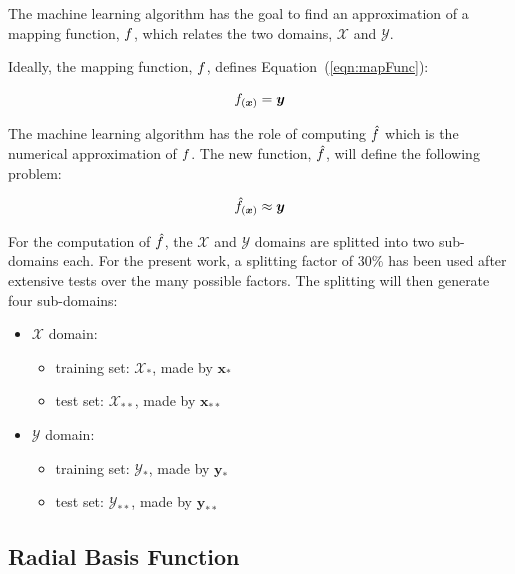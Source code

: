 The machine learning algorithm has the goal to find an approximation of a mapping function, $\mathnormal{f}$, which relates the 
two domains, $\mathcal{X}$ and $\mathcal{Y}$. 

Ideally, the mapping function, $\mathnormal{f}$, defines Equation~(\ref{eqn:mapFunc}):

\begin{equation}
    \mathnormal{f}_{(\boldsymbol{x})} = \boldsymbol{y}
    \label{eqn:mapFunc}
\end{equation}

The machine learning algorithm has the role of computing $\hat{\mathnormal{f}}$ which is the numerical approximation of $\mathnormal{f}$.
The new function, $\hat{\mathnormal{f}}$, will define the following problem:

\begin{equation}
    \hat{\mathnormal{f}}_{(\boldsymbol{x})} \approx \boldsymbol{y}
    \label{eqn:mapFuncML}
\end{equation}

For the computation of $\hat{\mathnormal{f}}$, the $\mathcal{X}$ and $\mathcal{Y}$ domains are splitted into two sub-domains each. 
For the present work, a splitting factor of $30\%$ has been used after extensive tests over the many possible factors.
The splitting will then generate four sub-domains:

\begin{itemize}
    \item $\mathcal{X}$ domain: 
        \begin{itemize}
            \item training set: $\mathcal{X}_{*}$, made by $\boldsymbol{x}_{*}$ 
            \item test set: $\mathcal{X}_{**}$, made by $\boldsymbol{x}_{**}$
        \end{itemize}
    \item $\mathcal{Y}$ domain:
        \begin{itemize} 
            \item training set: $\mathcal{Y}_{*}$, made by $\boldsymbol{y}_{*}$
            \item test set: $\mathcal{Y}_{**}$, made by $\boldsymbol{y}_{**}$
        \end{itemize}
\end{itemize}

\subsection{Radial Basis Function}

